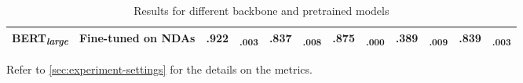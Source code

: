 \begin{table}[t]
\begin{threeparttable}
\begin{tabular}{llc@{\hskip0pt}cc@{\hskip0pt}cc@{\hskip0pt}cc@{\hskip0pt}cc@{\hskip0pt}c}
            BERT\textsubscript{\textit{large}} & Fine-tuned on NDAs & .922 & \textsubscript{.003} & .837 & \textsubscript{.008} & .875 & \textsubscript{.000} & .389 & \textsubscript{.009} & .839 & \textsubscript{.003} \\
            \bottomrule
        \end{tabular}
        \makeatletter\def\TPT@hsize{}\makeatletter
        \begin{tablenotes}
            \raggedright
            \fontsize{7pt}{7pt}\selectfont
            Refer to \cref{sec:experiment-settings} for the details on the metrics.
        \end{tablenotes}
    \end{threeparttable}
    \caption{Results for different backbone and pretrained models}\label{tab:results-pretrained}
\end{table}

